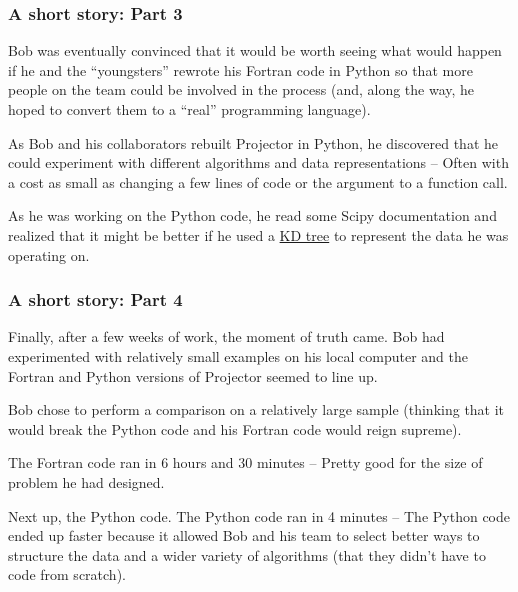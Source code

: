 \documentclass[
    xcolor={svgnames,dvipsnames},
    hyperref={colorlinks, citecolor=DeepPink4, linkcolor=DarkRed, urlcolor=DarkBlue}
]{beamer}  %
\newcommand{\1}{\mathbbm 1}
\begin{document}
\begin{frame}
    \frametitle{A short story: Part 3}

    Bob was eventually convinced that it would be worth seeing what would happen if he and the
    ``youngsters'' rewrote his Fortran code in Python so that more people on the team could be
    involved in the process (and, along the way, he hoped to convert them to a ``real''
    programming language).

    As Bob and his collaborators rebuilt Projector in Python, he discovered that he could
    experiment with different algorithms and data representations -- Often with a cost as small
    as changing a few lines of code or the argument to a function call.

    As he was working on the Python code, he read some Scipy documentation and realized that it
    might be better if he used a \href{https://docs.scipy.org/doc/scipy/reference/generated/scipy.spatial.KDTree.html}{KD tree}
    to represent the data he was operating on.

\end{frame}

\begin{frame}
    \frametitle{A short story: Part 4}

    Finally, after a few weeks of work, the moment of truth came. Bob had experimented with
    relatively small examples on his local computer and the Fortran and Python versions of
    Projector seemed to line up.

    Bob chose to perform a comparison on a relatively large sample (thinking that it would break
    the Python code and his Fortran code would reign supreme).

    The Fortran code ran in 6 hours and 30 minutes -- Pretty good for the size of problem he had
    designed.

    Next up, the Python code. The Python code ran in 4 minutes -- The Python code ended up faster
    because it allowed Bob and his team to select better ways to structure the data and a wider
    variety of algorithms (that they didn't have to code from scratch).

\end{frame}
\end{document}
